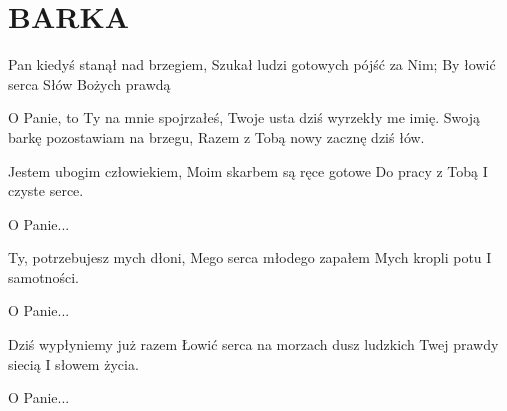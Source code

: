 \documentclass[../../../songbook.tex]{subfiles}
\begin{document}
\TabPositions{8cm} %
\section*{BARKA}
{}
\vspace{0.5cm}
Pan kiedyś stanął nad brzegiem,		 \newline
Szukał ludzi gotowych pójść za Nim;		 \newline
By łowić serca						 \newline
Słów Bożych prawdą					 \newline

\-\hspace{1cm} O Panie, to Ty na mnie spojrzałeś,		 \newline
\-\hspace{1cm} Twoje usta dziś wyrzekły me imię.		 \newline
\-\hspace{1cm} Swoją barkę pozostawiam na brzegu,		 \newline
\-\hspace{1cm} Razem z Tobą nowy zacznę dziś łów.		 \newline

Jestem ubogim człowiekiem, \newline
Moim skarbem są ręce gotowe \newline
Do pracy z Tobą \newline
I czyste serce. \newline

\-\hspace{1cm} O Panie... \newline

Ty, potrzebujesz mych dłoni, \newline
Mego serca młodego zapałem \newline
Mych kropli potu \newline
I samotności. \newline

\-\hspace{1cm} O Panie... \newline

Dziś wypłyniemy już razem \newline
Łowić serca na morzach dusz ludzkich  \newline
Twej prawdy siecią \newline
I słowem życia. \newline

\-\hspace{1cm} O Panie... \newline
\end{document}
